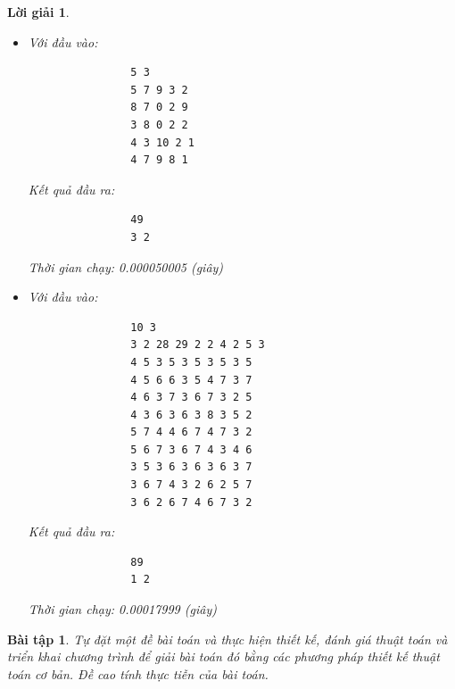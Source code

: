 \documentclass[14pt, a4paper]{article}
\theoremstyle{sltheorem}
\newtheorem{baitap}{Bài tập}
\theoremstyle{soltheorem}
\newtheorem*{loigiai}{Lời giải}
\begin{document}
\begin{loigiai}
\begin{itemize} [label={$-$}]
        \begin{itemize}
            \item Với đầu vào:
            \begin{verbatim}
                5 3        
                5 7 9 3 2
                8 7 0 2 9
                3 8 0 2 2
                4 3 10 2 1
                4 7 9 8 1
            \end{verbatim}
            Kết quả đầu ra:
            \begin{verbatim}
                49
                3 2
            \end{verbatim}
            Thời gian chạy: 0.000050005 (giây)
            \item Với đầu vào:
            \begin{verbatim}
                10 3
                3 2 28 29 2 2 4 2 5 3
                4 5 3 5 3 5 3 5 3 5
                4 5 6 6 3 5 4 7 3 7
                4 6 3 7 3 6 7 3 2 5
                4 3 6 3 6 3 8 3 5 2
                5 7 4 4 6 7 4 7 3 2
                5 6 7 3 6 7 4 3 4 6
                3 5 3 6 3 6 3 6 3 7
                3 6 7 4 3 2 6 2 5 7
                3 6 2 6 7 4 6 7 3 2
            \end{verbatim}
            Kết quả đầu ra:
            \begin{verbatim}
                89
                1 2
            \end{verbatim}
            Thời gian chạy: 0.00017999 (giây)
        \end{itemize}

    \end{itemize}

    \end{loigiai}

    \begin{baitap}
        Tự đặt một đề bài toán và thực hiện thiết kế, đánh giá thuật toán và triển khai
        chương trình để giải bài toán đó bằng các phương pháp thiết kế thuật toán cơ bản.
        Đề cao tính thực tiễn của bài toán.

    \end{baitap}
\end{document}
